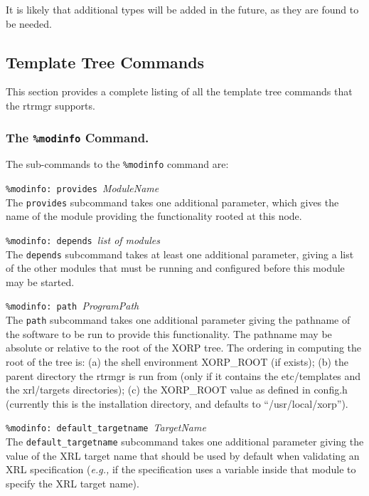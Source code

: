 \documentclass[11pt]{article}
\newcommand{\eg}{\emph{e.g.,}\xspace}
\begin{document}
It is likely that additional types will be added in the future, as
they are found to be needed.

\newpage

\subsection{Template Tree Commands}
This section provides a complete listing of all the template tree
commands that the rtrmgr supports.

\subsubsection{The {\tt \%modinfo} Command.}
The sub-commands to the {\tt \%modinfo} command are:

\begin{description}

\item {{\tt \%modinfo: provides }{\it ModuleName}}  \\
The {\tt provides} subcommand takes one additional parameter, which gives the
name of the module providing the functionality rooted at this node.

\item {{\tt \%modinfo: depends }{\it list of modules}}  \\
The {\tt depends} subcommand takes at least one additional
parameter, giving a list of the other modules that must
be running and configured before this module may be started.

\item {{\tt \%modinfo: path }{\it ProgramPath}}  \\
The {\tt path} subcommand takes one additional parameter giving the pathname
of the software to be run
to provide this functionality.  The pathname may be absolute or
relative to the root of the XORP tree. The ordering in computing the root of
the tree is: (a) the shell environment XORP\_ROOT (if exists); (b) the parent
directory the rtrmgr is run from (only if it contains the
etc/templates and the xrl/targets directories); (c) the XORP\_ROOT value as
defined in config.h (currently this is the installation directory, and
defaults to ``/usr/local/xorp'').

\item {{\tt \%modinfo: default\_targetname }{\it TargetName}}  \\
The {\tt default\_targetname} subcommand takes one additional parameter giving
the value of the XRL target name that should be used by default when
validating an XRL specification (\eg if the specification uses a variable
inside that module to specify the XRL target name).


\end{description}
\end{document}
